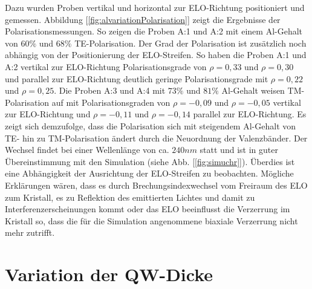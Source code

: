 %
Dazu wurden Proben vertikal und horizontal zur ELO-Richtung positioniert und gemessen. Abbildung [\ref{fig:alvariationPolarisation}] zeigt die Ergebnisse der Polarisationsmessungen. So zeigen die Proben A:1 und A:2 mit einem Al-Gehalt von $60\%$ und $68\%$ TE-Polarisation. Der Grad der Polarisation ist zus\"atzlich noch abh\"angig von der Positionierung der ELO-Streifen. So haben die Proben A:1 und A:2 vertikal zur ELO-Richtung Polarisationsgrade von $\rho = 0,33$ und $\rho = 0,30$ und parallel zur ELO-Richtung deutlich geringe Polarisationsgrade mit $\rho = 0,22$ und $\rho = 0,25$. Die Proben A:3 und A:4 mit $73\%$ und $81\%$ Al-Gehalt weisen TM-Polarisation auf mit Polarisationsgraden von $\rho = -0,09$ und $\rho = -0,05$ vertikal zur ELO-Richtung und $\rho = -0,11$ und $\rho = -0,14$ parallel zur ELO-Richtung. Es zeigt sich demzufolge, dass die Polarisation sich mit steigendem Al-Gehalt von TE- hin zu TM-Polarisation \"andert durch die Neuordnung der Valenzb\"ander. Der Wechsel findet bei einer Wellenl\"ange von ca. $240nm$ statt und ist in guter \"Ubereinstimmung mit den Simulation (siehe Abb. [\ref{fig:simuchr}]). \"Uberdies ist eine Abh\"angigkeit der Ausrichtung der ELO-Streifen zu beobachten. M\"ogliche Erkl\"arungen w\"aren, dass es durch Brechungsindexwechsel vom Freiraum des ELO zum Kristall, es zu Reflektion des emittierten Lichtes und damit zu Interferenzerscheinungen kommt oder das ELO beeinflusst die Verzerrung im Kristall so, dass die f\"ur die Simulation angenommene biaxiale Verzerrung nicht mehr zutrifft. 

\section{Variation der QW-Dicke}

